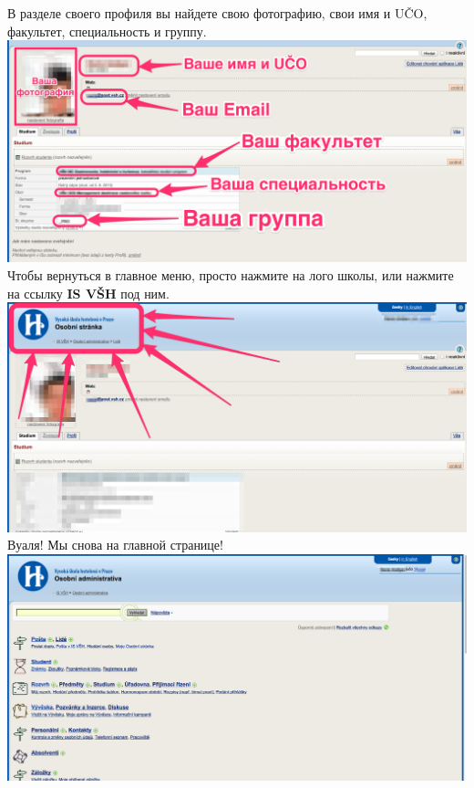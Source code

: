 \documentclass[a4paper,12pt]{article}
\begin{document}
В разделе своего профиля вы найдете свою фотографию, свои имя и UČO, 
факультет, специальность и группу. \\

\includegraphics[width=\textwidth]{s06} \\

\newpage
Чтобы вернуться в главное меню, просто нажмите на лого школы, 
или нажмите на ссылку \textbf{IS VŠH} под ним. \\

\includegraphics[width=\textwidth]{s07} \\

Вуаля! Мы снова на главной странице! \\

\includegraphics[width=\textwidth]{s04} \\
\end{document}
